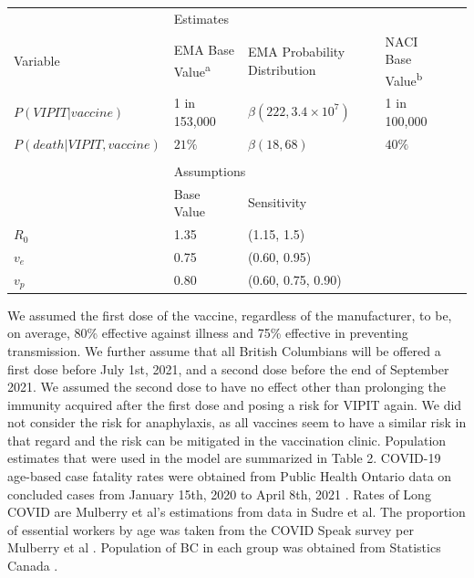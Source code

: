 \documentclass[]{interact}
\theoremstyle{plain}%
\theoremstyle{definition}
\theoremstyle{remark}
\begin{document}
\begin{table}
{\begin{tabular}{lllll} \toprule
 & \multicolumn{2}{l}{Estimates} \\ \cmidrule{2-4}
 Variable & EMA Base Value\textsuperscript{a} & EMA Probability Distribution & NACI Base Value\textsuperscript{b}  \\ \midrule
 $P(VIPIT|vaccine)$ & 1 in 153,000 & $\beta(222, 3.4\times 10^7)$ & 1 in 100,000 \\
 $P(death|VIPIT, vaccine)$ & $21\%$ &  $\beta(18, 68)$ & $40\%$ \\ \\
 & \multicolumn{2}{l}{Assumptions} \\ \cmidrule{2-4}
  & Base Value & Sensitivity & \\
 $R_0$ & 1.35 & (1.15, 1.5) &  \\ 
 $v_e$ & 0.75 & (0.60, 0.95) &  \\ 
 $v_p$ & 0.80 & (0.60, 0.75, 0.90) &  \\ \bottomrule 

\end{tabular}}
\label{harm-param}
\end{table}

We assumed the first dose of the vaccine, regardless of the
manufacturer, to be, on average, 80\% effective against illness and 75\%
effective in preventing transmission. We further assume that all British
Columbians will be offered a first dose before July 1st, 2021, and a
second dose before the end of September 2021. We assumed the second dose
to have no effect other than prolonging the immunity acquired after the
first dose and posing a risk for VIPIT again. We did not consider the
risk for anaphylaxis, as all vaccines seem to have a similar risk in
that regard and the risk can be mitigated in the vaccination clinic.
Population estimates that were used in the model are summarized in Table
2. COVID-19 age-based case fatality rates were obtained from Public
Health Ontario data on concluded cases from January 15th, 2020 to April
8th, 2021 \citep{public_health_ontario_all_2021}. Rates of Long COVID
are Mulberry et al's estimations from data in Sudre et
al\citep{sudre_attributes_2021}. The proportion of essential workers by
age was taken from the COVID Speak survey per Mulberry et al
\citep{mulberry_vaccine_2021}. Population of BC in each group was
obtained from Statistics Canada \citep{statistics_canada_census_2017}.
\end{document}
